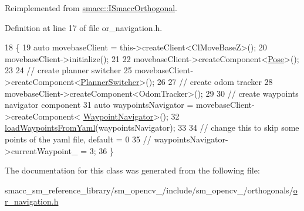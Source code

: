 Reimplemented from \hyperlink{classsmacc_1_1ISmaccOrthogonal_a6bb31c620cb64dd7b8417f8705c79c7a}{smacc\+::\+I\+Smacc\+Orthogonal}.



Definition at line 17 of file or\+\_\+navigation.\+h.


\begin{DoxyCode}
18         \{
19             \textcolor{keyword}{auto} movebaseClient = this->createClient<ClMoveBaseZ>();
20             movebaseClient->initialize();
21 
22             movebaseClient->createComponent<\hyperlink{classcl__move__base__z_1_1Pose}{Pose}>();
23 
24             \textcolor{comment}{// create planner switcher}
25             movebaseClient->createComponent<\hyperlink{classcl__move__base__z_1_1PlannerSwitcher}{PlannerSwitcher}>();
26 
27             \textcolor{comment}{// create odom tracker}
28             movebaseClient->createComponent<OdomTracker>();
29 
30             \textcolor{comment}{// create waypoints navigator component}
31             \textcolor{keyword}{auto} waypointsNavigator = movebaseClient->createComponent<
      \hyperlink{classcl__move__base__z_1_1WaypointNavigator}{WaypointNavigator}>();
32             \hyperlink{classsm__opencv__2_1_1OrNavigation_a7d151913cbad3b640163c4b2e84bfb35}{loadWaypointsFromYaml}(waypointsNavigator);
33 
34             \textcolor{comment}{// change this to skip some points of the yaml file, default = 0}
35             \textcolor{comment}{// waypointsNavigator->currentWaypoint\_ = 3;}
36         \}
\end{DoxyCode}


The documentation for this class was generated from the following file\+:\begin{DoxyCompactItemize}
\item 
smacc\+\_\+sm\+\_\+reference\+\_\+library/sm\+\_\+opencv\+\_/include/sm\+\_\+opencv\+\_/orthogonals/\hyperlink{sm__opencv__2_2include_2sm__opencv__2_2orthogonals_2or__navigation_8h}{or\+\_\+navigation.\+h}\end{DoxyCompactItemize}
